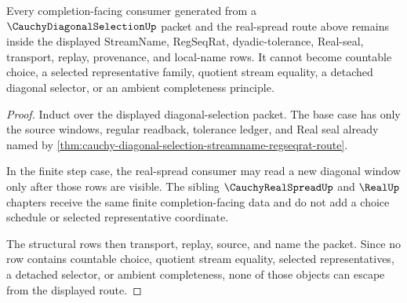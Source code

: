 \begin{theorem}
\label{thm:cauchy-diagonal-selection-nonescape}
Every completion-facing consumer generated from a $\CauchyDiagonalSelectionUp$ packet and the real-spread route above remains inside the displayed StreamName, RegSeqRat, dyadic-tolerance, Real-seal, transport, replay, provenance, and local-name rows. It cannot become countable choice, a selected representative family, quotient stream equality, a detached diagonal selector, or an ambient completeness principle.
\end{theorem}
\begin{proof}
Induct over the displayed diagonal-selection packet. The base case has only the source windows, regular readback, tolerance ledger, and Real seal already named by \autoref{thm:cauchy-diagonal-selection-streamname-regseqrat-route}.

In the finite step case, the real-spread consumer may read a new diagonal window only after those rows are visible. The sibling $\CauchyRealSpreadUp$ and $\RealUp$ chapters receive the same finite completion-facing data and do not add a choice schedule or selected representative coordinate.

The structural rows then transport, replay, source, and name the packet. Since no row contains countable choice, quotient stream equality, selected representatives, a detached selector, or ambient completeness, none of those objects can escape from the displayed route.
\end{proof}
